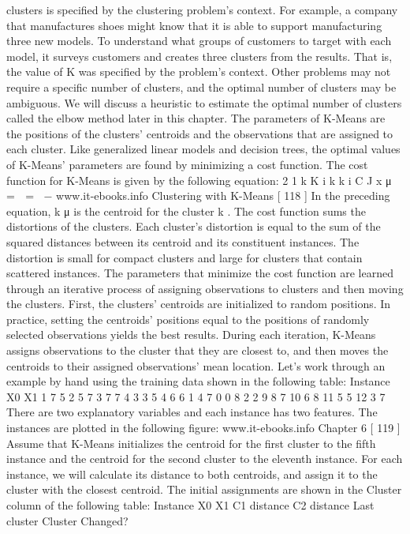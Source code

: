 clusters is specified by the clustering problem's context. For example, a company that
manufactures shoes might know that it is able to support manufacturing three new
models. To understand what groups of customers to target with each model, it surveys
customers and creates three clusters from the results. That is, the value of K was
specified by the problem's context. Other problems may not require a specific number
of clusters, and the optimal number of clusters may be ambiguous. We will discuss a
heuristic to estimate the optimal number of clusters called the elbow method later in
this chapter.
The parameters of K-Means are the positions of the clusters' centroids and the
observations that are assigned to each cluster. Like generalized linear models and
decision trees, the optimal values of K-Means' parameters are found by minimizing
a cost function. The cost function for K-Means is given by the following equation:
2
1 k
K
i k
k i C
J x μ
= 
= −
www.it-ebooks.info
Clustering with K-Means
[ 118 ]
In the preceding equation, k
μ is the centroid for the cluster k . The cost function sums
the distortions of the clusters. Each cluster's distortion is equal to the sum of the
squared distances between its centroid and its constituent instances. The distortion is
small for compact clusters and large for clusters that contain scattered instances. The
parameters that minimize the cost function are learned through an iterative process
of assigning observations to clusters and then moving the clusters. First, the clusters'
centroids are initialized to random positions. In practice, setting the centroids'
positions equal to the positions of randomly selected observations yields the best
results. During each iteration, K-Means assigns observations to the cluster that they
are closest to, and then moves the centroids to their assigned observations' mean
location. Let's work through an example by hand using the training data shown in
the following table:
Instance X0 X1
1 7 5
2 5 7
3 7 7
4 3 3
5 4 6
6 1 4
7 0 0
8 2 2
9 8 7
10 6 8
11 5 5
12 3 7
There are two explanatory variables and each instance has two features. The instances
are plotted in the following figure:
www.it-ebooks.info
Chapter 6
[ 119 ]
Assume that K-Means initializes the centroid for the first cluster to the fifth instance
and the centroid for the second cluster to the eleventh instance. For each instance,
we will calculate its distance to both centroids, and assign it to the cluster with the
closest centroid. The initial assignments are shown in the Cluster column of the
following table:
Instance X0 X1 C1 distance C2 distance Last cluster Cluster Changed?
